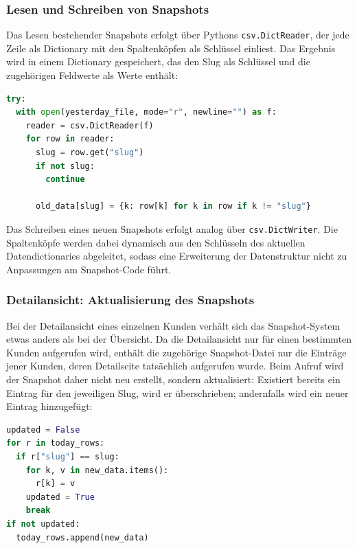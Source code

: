 \subsubsection{Lesen und Schreiben von Snapshots}
Das Lesen bestehender Snapshots erfolgt über Pythons \texttt{csv.DictReader}, der jede Zeile als Dictionary mit den Spaltenköpfen als Schlüssel einliest. Das Ergebnis wird in einem Dictionary gespeichert, das den Slug als Schlüssel und die zugehörigen Feldwerte als Werte enthält:

\begin{lstlisting}[language=Python, caption={Einlesen eines bestehenden Snapshots}, label={lst:snapshot-read}]
try:
  with open(yesterday_file, mode="r", newline="") as f:
    reader = csv.DictReader(f)
    for row in reader:
      slug = row.get("slug")
      if not slug:
        continue

      old_data[slug] = {k: row[k] for k in row if k != "slug"}
\end{lstlisting}

Das Schreiben eines neuen Snapshots erfolgt analog über \texttt{csv.DictWriter}. Die Spaltenköpfe werden dabei dynamisch aus den Schlüsseln des aktuellen Datendictionaries abgeleitet, sodass eine Erweiterung der Datenstruktur nicht zu Anpassungen am Snapshot-Code führt.

\subsubsection{Detailansicht: Aktualisierung des Snapshots}
Bei der Detailansicht eines einzelnen Kunden verhält sich das Snapshot-System etwas anders als bei der Übersicht. Da die Detailansicht nur für einen bestimmten Kunden aufgerufen wird, enthält die zugehörige Snapshot-Datei nur die Einträge jener Kunden, deren Detailseite tatsächlich aufgerufen wurde. Beim Aufruf wird der Snapshot daher nicht neu erstellt, sondern aktualisiert: Existiert bereits ein Eintrag für den jeweiligen Slug, wird er überschrieben; andernfalls wird ein neuer Eintrag hinzugefügt:

\begin{lstlisting}[language=Python, caption={Aktualisierung des Detailansicht-Snapshots}, label={lst:snapshot-update}]
updated = False
for r in today_rows:
  if r["slug"] == slug:
    for k, v in new_data.items():
      r[k] = v
    updated = True
    break
if not updated:
  today_rows.append(new_data)
\end{lstlisting}

